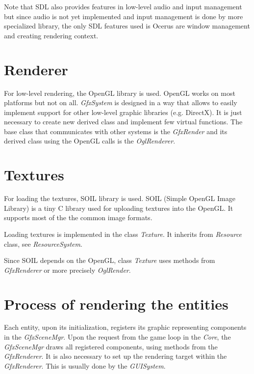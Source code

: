 Note that SDL also provides features in low-level audio and input management but since audio is not yet implemented and input management is done by more specialized library, the only SDL features used is Ocerus are window management and creating rendering context.

\section{Renderer}
For low-level rendering, the OpenGL library is used. OpenGL works on most platforms but not on all. \emph{GfxSystem} is designed in a way that allows to easily implement support for other low-level graphic libraries (e.g. DirectX). It is just necessary to create new derived class and implement few virtual functions. The base class that communicates with other systems is the \emph{GfxRender} and its derived class using the OpenGL calls is the \emph{OglRenderer}.

\section{Textures}
For loading the textures, SOIL library is used.
SOIL (Simple OpenGL Image Library) is a tiny C library used for uploading textures into the OpenGL. It supports most of the the common image formats.

Loading textures is implemented in the class \emph{Texture}. It inherits from  \emph{Resource} class, see \emph{ResourceSystem}. 

Since SOIL depends on the OpenGL, class \emph{Texture} uses methods from \emph{GfxRenderer} or more precisely \emph{OglRender}.
 
\section{Process of rendering the entities}
Each entity, upon its initialization, registers its graphic representing components in the \emph{GfxSceneMgr}. Upon the request from the game loop in the \emph{Core}, the \emph{GfxSceneMgr} draws all registered components, using methods from the  \emph{GfxRenderer}. It is also necessary to set up the rendering target within the \emph{GfxRenderer}. This is usually done by the \emph{GUISystem}.


%


